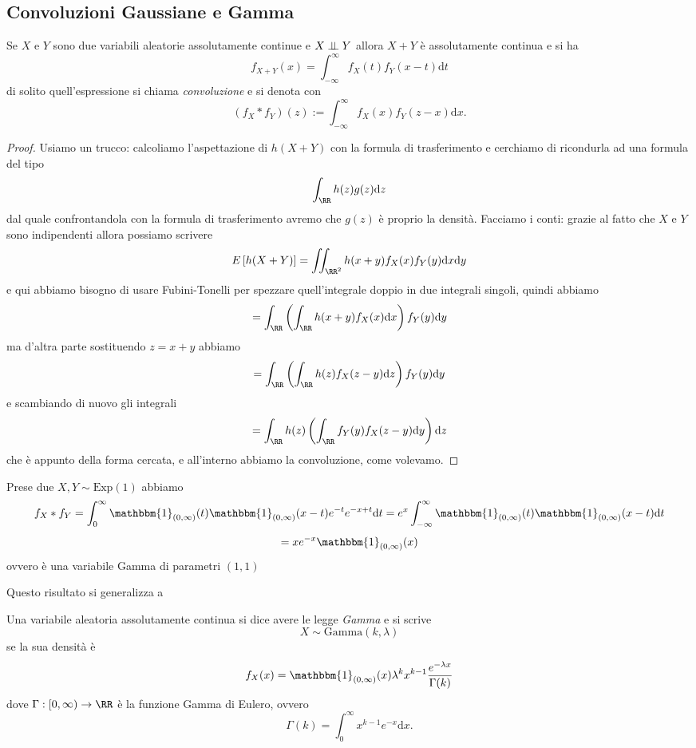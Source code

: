 \documentclass[11pt]{scrartcl}
\newcommand{\dif}{\text{d}}
\begin{document}
	\subsection{Convoluzioni Gaussiane e Gamma}
	\begin{proposition}[Convoluzioni]
		Se $X$ e $Y$ sono due variabili aleatorie assolutamente continue e $X\indep Y$ allora $X+Y$ è assolutamente continua e si ha
		$$f_{X+Y}(x)=\int_{-\infty}^\infty f_X(t)f_{Y}(x-t)\dif t$$
		di solito quell'espressione si chiama \textit{convoluzione} e si denota con
		$$(f_X*f_Y)(z):=\int_{-\infty}^\infty f_X(x)f_{Y}(z-x)\dif x.$$
	\end{proposition}
	\begin{proof}
		Usiamo un trucco: calcoliamo l'aspettazione di $h(X+Y)$ con la formula di trasferimento e cerchiamo di ricondurla ad una formula del tipo
		$$\int_\RR h(z)g(z)\dif z$$
		dal quale confrontandola con la formula di trasferimento avremo che $g(z)$ è proprio la densità. Facciamo i conti:
		grazie al fatto che $X$ e $Y$ sono indipendenti allora possiamo scrivere
		$$E\left[h(X+Y)\right]=\iint_{\RR^2}h(x+y)f_X(x)f_Y(y)\dif x \dif y $$
		e qui abbiamo bisogno di usare Fubini-Tonelli per spezzare quell'integrale doppio in due integrali singoli, quindi abbiamo
		$$=\int_\RR \left(\int_\RR h(x+y)f_X(x)\dif x\right)f_Y(y)\dif y$$
		ma d'altra parte sostituendo $z=x+y$ abbiamo
		$$=\int_{\RR}\left(\int_\RR h(z)f_X(z-y)\dif z\right)f_Y(y)\dif y$$
		e scambiando di nuovo gli integrali
		$$=\int_{\RR}h(z)\left(\int_\RR f_Y(y)f_X(z-y)\dif y\right)\dif z$$
		che è appunto della forma cercata, e all'interno abbiamo la convoluzione, come volevamo. 
	\end{proof}
	\begin{example}
		Prese due $X,Y\sim \text{Exp}(1)$ abbiamo
		$$f_X*f_Y=\int_0^\infty \mathbbm{1}_{(0,\infty)}(t)\mathbbm{1}_{(0,\infty)}(x-t)e^{-t}e^{-x+t}\dif t=e^{x}\int_{-\infty}^{\infty}\mathbbm{1}_{(0,\infty)}(t)\mathbbm{1}_{(0,\infty)}(x-t)\dif t$$
		$$=xe^{-x}\mathbbm{1}_{(0,\infty)}(x)$$
		ovvero è una variabile Gamma di parametri $(1,1)$
	\end{example}
	Questo risultato si generalizza a 
	\begin{definition}
		Una variabile aleatoria assolutamente continua si dice avere le legge \textit{Gamma} e si scrive 
		$$X\sim \text{Gamma}(k,\lambda)$$
		se la sua densità è
		$$f_X(x)=\mathbbm{1}_{(0,\infty)}(x)\lambda^k x^{k-1}\frac{e^{-\lambda x}}{\Gamma(k)}$$
		dove $\Gamma:[0,\infty)\to \RR$ è la funzione Gamma di Eulero, ovvero
		$$\Gamma(k)=\int_0^\infty x^{k-1}e^{-x}\dif x.$$
	\end{definition}
\end{document}
